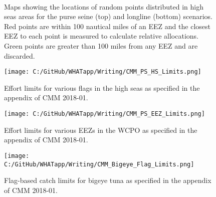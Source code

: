 \documentclass[11pt]{article}
\begin{document}
 \begin{figure}[!htb]
 \centering

    \\
 \caption{Maps showing the locations of random points distributed in high seas areas for the purse seine (top) and longline (bottom) scenarios. Red points are within 100 nautical miles of an EEZ and the closest EEZ to each point is measured to calculate relative allocations. Green points are greater than 100 miles from any EEZ and are discarded.}\label{fig:adjPS}
 \end{figure}


\newpage
 \begin{figure}[!htb]
  \centering
\texttt{[image: C:/GitHub/WHATapp/Writing/CMM\_PS\_HS\_Limits.png]}
  \caption {Effort limits for various flags in the high seas as specified in the appendix of CMM 2018-01.}
  \label{fig:CMM1}
\end{figure}


\newpage
 \begin{figure}[!htb]
  \centering
\texttt{[image: C:/GitHub/WHATapp/Writing/CMM\_PS\_EEZ\_Limits.png]}
  \caption {Effort limits for various EEZs in the WCPO as specified in the appendix of CMM 2018-01.}
  \label{fig:CMM2}
\end{figure}


\newpage
 \begin{figure}[!htb]
  \centering
\texttt{[image: C:/GitHub/WHATapp/Writing/CMM\_Bigeye\_Flag\_Limits.png]}
  \caption {Flag-based catch limits for bigeye tuna as specified in the appendix of CMM 2018-01.}
  \label{fig:CMM3}
\end{figure}
\end{document}
